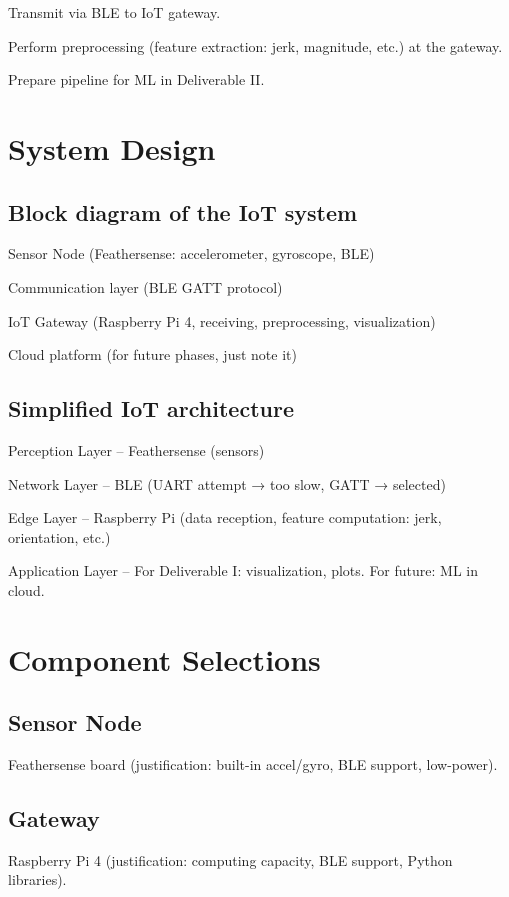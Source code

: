 \documentclass[conference]{lib/IEEEtran}
\begin{document}
Transmit via BLE to IoT gateway.

Perform preprocessing (feature extraction: jerk, magnitude, etc.) at the gateway.

Prepare pipeline for ML in Deliverable II.

\section{System Design}


\subsection{Block diagram of the IoT system}
Sensor Node (Feathersense: accelerometer, gyroscope, BLE)

Communication layer (BLE GATT protocol)

IoT Gateway (Raspberry Pi 4, receiving, preprocessing, visualization)

Cloud platform (for future phases, just note it)


\subsection{Simplified IoT architecture}

Perception Layer – Feathersense (sensors)

Network Layer – BLE (UART attempt → too slow, GATT → selected)

Edge Layer – Raspberry Pi (data reception, feature computation: jerk, orientation, etc.)

Application Layer – For Deliverable I: visualization, plots. For future: ML in cloud.


\section{Component Selections}\label{CS}

\subsection{Sensor Node}\label{SN}
Feathersense board (justification: built-in accel/gyro, BLE support, low-power).

\subsection{Gateway}\label{GW}
Raspberry Pi 4 (justification: computing capacity, BLE support, Python libraries).
\end{document}
